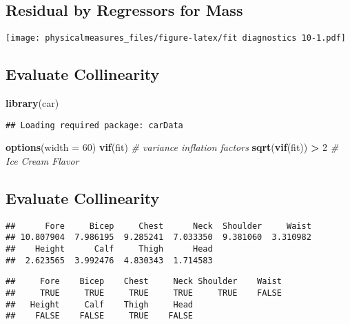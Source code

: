 \documentclass[]{article}
\newenvironment{Shaded}{\begin{snugshade}}{\end{snugshade}}
\newcommand{\KeywordTok}[1]{\textcolor[rgb]{0.13,0.29,0.53}{\textbf{#1}}}
\newcommand{\DataTypeTok}[1]{\textcolor[rgb]{0.13,0.29,0.53}{#1}}
\newcommand{\DecValTok}[1]{\textcolor[rgb]{0.00,0.00,0.81}{#1}}
\newcommand{\StringTok}[1]{\textcolor[rgb]{0.31,0.60,0.02}{#1}}
\newcommand{\CommentTok}[1]{\textcolor[rgb]{0.56,0.35,0.01}{\textit{#1}}}
\newcommand{\OperatorTok}[1]{\textcolor[rgb]{0.81,0.36,0.00}{\textbf{#1}}}
\newcommand{\NormalTok}[1]{#1}
\begin{document}
\subsection{Residual by Regressors for
Mass}\label{residual-by-regressors-for-mass-19}

\texttt{[image: physicalmeasures\_files/figure-latex/fit diagnostics 10-1.pdf]}

\subsection{Evaluate Collinearity}\label{evaluate-collinearity}

\begin{Shaded}
\begin{Highlighting}[]
\KeywordTok{library}\NormalTok{(car)}
\end{Highlighting}
\end{Shaded}

\begin{verbatim}
## Loading required package: carData
\end{verbatim}

\begin{Shaded}
\begin{Highlighting}[]
\KeywordTok{options}\NormalTok{(}\DataTypeTok{width =} \DecValTok{60}\NormalTok{)}
\KeywordTok{vif}\NormalTok{(fit) }\CommentTok{# variance inflation factors}
\KeywordTok{sqrt}\NormalTok{(}\KeywordTok{vif}\NormalTok{(fit)) }\OperatorTok{>}\StringTok{ }\DecValTok{2} \CommentTok{# Ice Cream Flavor}
\end{Highlighting}
\end{Shaded}

\subsection{Evaluate Collinearity}\label{evaluate-collinearity-1}

\begin{verbatim}
##      Fore     Bicep     Chest      Neck  Shoulder     Waist 
## 10.807904  7.986195  9.285241  7.033350  9.381060  3.310982 
##    Height      Calf     Thigh      Head 
##  2.623565  3.992476  4.830343  1.714583
\end{verbatim}

\begin{verbatim}
##     Fore    Bicep    Chest     Neck Shoulder    Waist 
##     TRUE     TRUE     TRUE     TRUE     TRUE    FALSE 
##   Height     Calf    Thigh     Head 
##    FALSE    FALSE     TRUE    FALSE
\end{verbatim}
\end{document}
